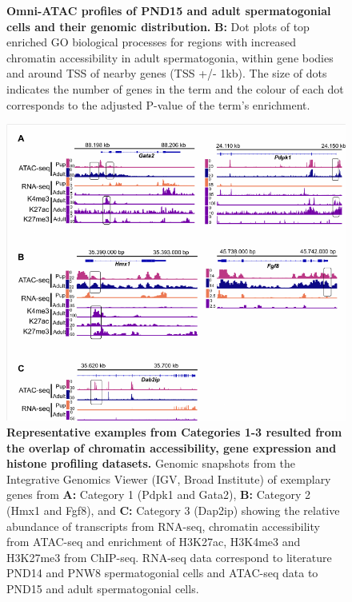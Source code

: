 \documentclass[12pt,twoside]{reedthesis}
\begin{document}
\begin{subfigures}
\begin{figure}[H]
{}

\caption[Omni-ATAC profiles of PND15 and adult spermatogonial cells and their genomic distribution]{\textbf{Omni-ATAC profiles of PND15 and adult spermatogonial cells and their genomic distribution.} \newline \textbf{B:} Dot plots of top enriched GO biological processes for regions with increased chromatin accessibility in adult spermatogonia, within gene bodies and around TSS of nearby genes (TSS +/- 1kb). The size of dots indicates the number of genes in the term and the colour of each dot corresponds to the adjusted P-value of the term’s enrichment.}\label{fig:ds2b}
\end{figure}
\end{subfigures}

\begin{figure}[H]

{\centering \includegraphics{thesis_files/figure-latex/ds3-1} 

}

\caption[Representative examples from Categories 1-3 resulted from the overlap of chromatin accessibility, gene expression and histone profiling datasets]{\textbf{Representative examples from Categories 1-3 resulted from the overlap of chromatin accessibility, gene expression and histone profiling datasets.} Genomic snapshots from the Integrative Genomics Viewer (IGV, Broad Institute) of exemplary genes from \textbf{A:} Category 1 (Pdpk1 and Gata2), \textbf{B:} Category 2 (Hmx1 and Fgf8), and \textbf{C:} Category 3 (Dap2ip) showing the relative abundance of transcripts from RNA-seq, chromatin accessibility from ATAC-seq and enrichment of H3K27ac, H3K4me3 and H3K27me3 from ChIP-seq. RNA-seq data correspond to literature PND14 and PNW8 spermatogonial cells and ATAC-seq data to PND15 and adult spermatogonial cells.}\label{fig:ds3}
\end{figure}
\end{document}
